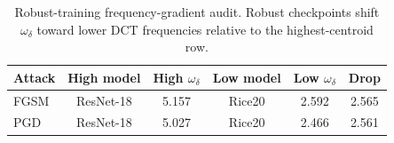 \begin{table}[t]
\caption{Robust-training frequency-gradient audit. Robust checkpoints shift \(\omega_\delta\) toward lower DCT frequencies relative to the highest-centroid row.}
\label{tab:robust-grad}
\centering
\scriptsize
\begin{tabular}{lccccc}
\hline
Attack & High model & High \(\omega_\delta\) & Low model & Low \(\omega_\delta\) & Drop \\
\hline
FGSM & ResNet-18 & 5.157 & Rice20 & 2.592 & 2.565 \\
PGD & ResNet-18 & 5.027 & Rice20 & 2.466 & 2.561 \\
\hline
\end{tabular}
\end{table}
